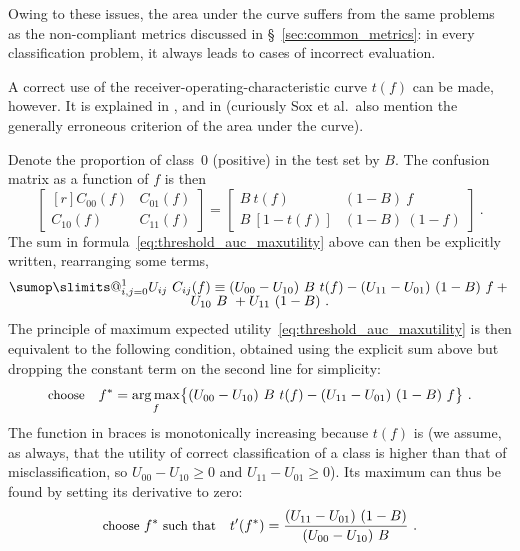 \documentclass[\ifafour a4paper,12pt,\else a5paper,10pt,\fi%
onecolumn,oneside,article,%
british%
]{memoir}
\makeatletter
\theoremstyle{remark}
\theoremstyle{innote}
\def\sum{\DOTSI\sumop\slimits@}
\renewcommand*{\ge}{\geqslant}%
\DeclarePairedDelimiter\set{\{}{\}} %
\renewcommand*{\|}[1][]{\nonscript\:#1\vert\nonscript\:\mathopen{}}
\newcommand*{\sect}{\S}%
\newcommand*{\etal}{{et al.}}
\DeclareMathOperator*{\argmax}{arg\,max}
\newcommand*{\umatrix}[4]{\begin{bmatrix*}[r]#1&#2\\#3&#4\end{bmatrix*}}
\makeatother
\begin{document}
Owing to these issues, the area under the curve suffers from the same problems as the non-compliant metrics discussed in \sect~\ref{sec:common_metrics}: in every classification problem, it always leads to cases of incorrect evaluation.

A correct use of the receiver-operating-characteristic curve $t(f)$ can be made, however. It is explained in \cite[section \emph{Cost/Benefit Analysis} p.~295]{metz1978}, and in \cite[\sect~5.7.4]{soxetal1988_r2013} (curiously Sox \etal\ also mention the generally erroneous criterion of the area under the curve).

Denote the proportion of class~$0$ (positive) in the test set by $B$. The confusion matrix as a function of $f$ is then
\begin{equation}
  \label{eq:CM_fromrates}
  \umatrix{
    C_{00}(f) }{ C_{01}(f)}{ C_{10}(f) }{ C_{11}(f)
  }
  =
  \begin{bmatrix}
    B\ t(f) & (1-B)\ f \\ B\ [1-t(f)] &(1-B)\ (1-f)
  \end{bmatrix} \ .
\end{equation}
The sum in formula~\eqref{eq:threshold_auc_maxutility} above can then be explicitly written, rearranging some terms,
\begin{multline}
  \label{eq:sum_UC}
  \sum_{i,j=0}^{1} U_{ij}\ C_{ij}(f) \equiv
      (U_{00} - U_{10})\  B\ t(f) -
    (U_{11} - U_{01})\ (1-B)\ f
    +{}\\[-2\jot]
    U_{10}\ B\ + U_{11}\ (1-B) \ .
\end{multline}
The principle of maximum expected utility~\eqref{eq:threshold_auc_maxutility} is  then equivalent to the following condition, obtained using the explicit sum above but dropping the constant term on the second line for simplicity:
\begin{equation}
  \label{eq:threshold_auc_maxutility_rates}
  \text{\small choose}\quad
  f^{*} = \argmax_{f}\set[\big]{
    (U_{00} - U_{10})\  B\ t(f) -
    (U_{11} - U_{01})\ (1-B)\ f
} \ .
  \end{equation}
The function in braces is monotonically increasing because $t(f)$ is (we assume, as always, that the utility of correct classification of a class is higher than that of misclassification, so $U_{00}-U_{10} \ge 0$ and $U_{11}-U_{01} \ge 0$). Its maximum can thus be found by setting its derivative to zero:
\begin{equation}
  \label{eq:threshold_auc_maxutility_derivat}
  \text{\small choose } f^{*} \text{\small\ such that}\quad
t'(f^{*}) = \frac{(U_{11} - U_{01})\ (1-B)}{(U_{00} - U_{10})\  B} \ .
\end{equation}
\end{document}
